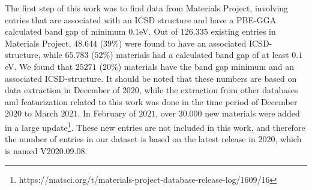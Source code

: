 \begin{comment}
\section{Time of extraction and featurization}

The initial thought behind

\begin{table}[!ht]
\centering
\caption{}
\label{tab:timing-extraction}
\noindent\makebox[\textwidth]{
\begin{tabular}{M{3.0cm} M{4.0cm} M{4.0cm}}
  \hline
  \hline
  Database & Extraction period & Estimated time usage  \\
  \hline
  Materials Project & December $2020$ & $5$ min \\
  Citrine Informatics & December $2020$ & $2$ min  \\
  OQMD & December $2020$ & $3$ min \\
  AFLOW & January $2020$ - February $2021$ & $17$ days \\
  AFLOW-ML & January $2020$ - February $2021$ & $16$ days \\
  JARVIS-DFT & January $2020$ & $5$ min \\
  \hline
  \hline
\end{tabular}
}
\end{table}

\end{comment}
The first step of this work was to find data from Materials Project, involving entries that are associated with an ICSD structure and have a PBE-GGA calculated band gap of minimum $0.1$eV. Out of $126.335$ existing entries in Materials Project, $48.644$ ($39\%$) were found to have an associated ICSD-structure, while $65.783$ ($52\%$) materials had a calculated band gap of at least $0.1$eV. We found that $25271$ ($20\%$) materials have the band gap minimum and an associated ICSD-structure. It should be noted that these numbers are based on data extraction in December of $2020$, while the extraction from other databases and featurization related to this work was done in the time period of December $2020$ to March $2021$. In February of $2021$, over $30.000$ new materials were added in a large update\footnote{https://matsci.org/t/materials-project-database-release-log/1609/16}. These new entries are not included in this work, and therefore the number of entries in our dataset is based on the latest release in $2020$, which is named V2020.09.08.%

